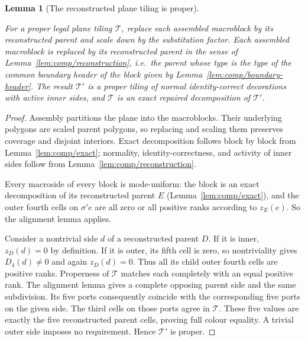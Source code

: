 \documentclass[11pt,a4paper]{article}
\newtheorem{lemma}[definition]{Lemma}
\theoremstyle{remark}
\newcommand{\lean}[1]{}
\newcommand{\uses}[1]{}
\begin{document}
\begin{lemma}[The reconstructed plane tiling is proper]
\label{lem:comp/proper}
\lean{Tilings.Planned.composed_proper,Tilings.Planned.Strict.strict_composed_proper}
\uses{lem:comp/assembly,lem:comp/exact,lem:comp/alignment,lem:comp/reconstruction,lem:comp/boundary-header}
For a proper legal plane tiling $\mathcal T$, replace each assembled
macroblock by its reconstructed parent and scale down by the substitution
factor. Each assembled macroblock is replaced by its reconstructed parent in
the sense of Lemma~\ref{lem:comp/reconstruction}, i.e.\ the parent whose
type is the type of the common boundary header of the block given by
Lemma~\ref{lem:comp/boundary-header}. The result $\mathcal T'$ is a proper tiling of normal identity-correct decorations
with active inner sides, and $\mathcal T$ is an exact repaired decomposition
of $\mathcal T'$.
\end{lemma}
\begin{proof}
Assembly partitions the plane into the macroblocks. Their underlying
polygons are scaled parent polygons, so replacing and scaling them preserves
coverage and disjoint interiors. Exact decomposition follows block by block
from Lemma~\ref{lem:comp/exact}; normality, identity-correctness, and activity of inner sides follow
from Lemma~\ref{lem:comp/reconstruction}.

Every macroside of every block is mode-uniform: the block is an exact
decomposition of its reconstructed parent $E$ (Lemma~\ref{lem:comp/exact}),
and the outer fourth cells on $\sigma'e$ are all zero or all positive
ranks according to $z_E(e)$. So the alignment lemma applies.

Consider a nontrivial side $d$ of a reconstructed parent $D$. If it is
inner, $z_D(d)=0$ by definition. If it is outer, its fifth cell is zero,
so nontriviality gives $D_4(d)\ne0$ and again $z_D(d)=0$. Thus all its
child outer fourth cells are positive ranks. Properness of $\mathcal T$
matches each completely with an equal positive rank. The alignment lemma
gives a complete opposing parent side and the same subdivision. Its five
ports consequently coincide with the corresponding five ports on the
given side. The third cells on those ports agree in $\mathcal T$. These
five values are exactly the five reconstructed parent cells, proving full
colour equality. A trivial outer side imposes no requirement. Hence
$\mathcal T'$ is proper.
\end{proof}
\end{document}
